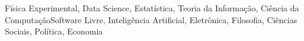 


\begin{cventries}



\cventry
{} %
{} %
{} %
{} %
{Física Experimental, Data Science, Estatística, Teoria da Informação, Ciência da Computação\newline Software Livre, Inteligência Artificial, Eletrônica, Filosofia, Ciências Sociais, Política, Economia}\newline



\end{cventries}